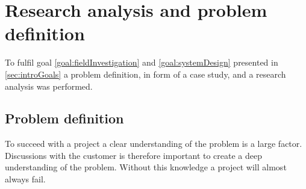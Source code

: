 \section{Research analysis and problem definition}\label{sec:methodProblemDefinition}






To fulfil goal \ref{goal:fieldInvestigation} and \ref{goal:systemDesign} presented in \cref{sec:introGoals} a problem definition, in form of a case study, and a research analysis was performed.

\subsection{Problem definition}\label{sec:methodProblemDefinition}
To succeed with a project a clear understanding of the problem is a large factor.
Discussions with the customer is therefore important to create a deep understanding of the problem.
Without this knowledge a project will almost always fail.
\cite{SecretsSuccessfulSimulation1995}

